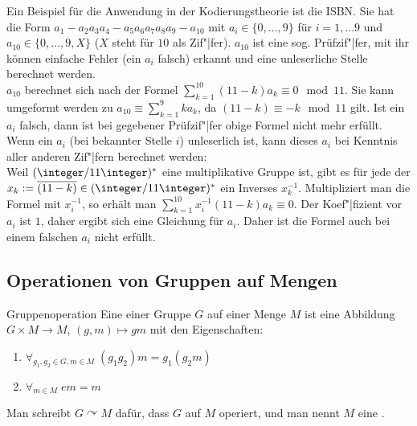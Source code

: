 \linie

\begin{Bsp}
    Ein Beispiel für die Anwendung in der Kodierungstheorie ist die ISBN.
    Sie hat die Form $a_1 - a_2 a_3 a_4 - a_5 a_6 a_7 a_8 a_9 - a_{10}$
    mit $a_i \in \{0, \dotsc, 9\}$ für $i = 1, \dotsc 9$ und
    $a_{10} \in \{0, \dotsc, 9, X\}$
    ($X$ steht für $10$ als Zif"|fer).
    $a_{10}$ ist eine sog. Prüfzif"|fer, mit ihr können einfache Fehler
    (ein $a_i$ falsch) erkannt und eine unleserliche Stelle
    berechnet werden.\\
    $a_{10}$ berechnet sich nach der Formel
    $\sum_{k=1}^{10} (11 - k) a_k \equiv 0 \mod 11$.
    Sie kann umgeformt werden zu $a_{10} \equiv \sum_{k=1}^9 k a_k$,
    da $(11 - k) \equiv -k \mod 11$ gilt.
    Ist ein $a_i$ falsch, dann ist bei gegebener Prüfzif"|fer obige
    Formel nicht mehr erfüllt.
    Wenn ein $a_i$ (bei bekannter Stelle $i$) unleserlich ist,
    kann dieses $a_i$ bei Kenntnis aller anderen Zif"|fern berechnet werden:\\
    Weil $(\integer/11\integer)^\ast$ eine multiplikative Gruppe ist,
    gibt es für jede der
    $x_k := \overline{(11 - k)} \in (\integer/11\integer)^\ast$
    ein Inverses $x_k^{-1}$.
    Multipliziert man die Formel mit $x_i^{-1}$, so erhält man
    $\sum_{k=1}^{10} x_i^{-1} (11 - k) a_k \equiv 0$.
    Der Koef"|fizient vor $a_i$ ist $1$, daher ergibt sich eine Gleichung für
    $a_i$.
    Daher ist die Formel auch bei einem falschen $a_i$ nicht erfüllt.
\end{Bsp}

\pagebreak

\subsection{%
    Operationen von Gruppen auf Mengen%
}

\begin{Def}{Gruppenoperation}
    Eine  einer Gruppe $G$ auf einer Menge $M$
    ist eine Abbildung $G \times M \rightarrow M$,
    $(g, m) \mapsto gm$ mit den Eigenschaften:
    \begin{enumerate}[label=(O\arabic*)]
        \item
        $\forall_{g_1, g_2 \in G, m \in M}\; (g_1 g_2) m = g_1 (g_2 m)$
        
        \item
        $\forall_{m \in M}\; em = m$
    \end{enumerate}
    Man schreibt $G \curvearrowright M$ dafür,
    dass $G$ auf $M$ operiert,
    und man nennt $M$ eine .
\end{Def}

